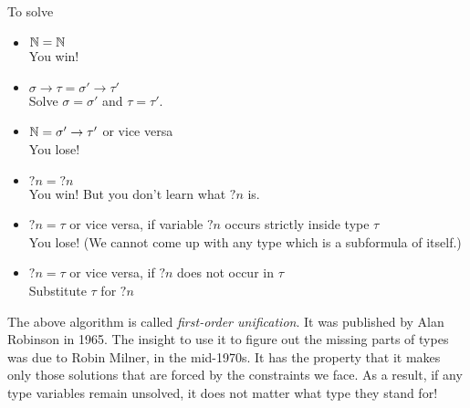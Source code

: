 \documentclass{article}
\begin{document}
To solve
\begin{itemize}
\item $\mathbb{N} = \mathbb{N}$ \\ You win!
\item $\sigma\to\tau = \sigma'\to\tau'$ \\
  Solve $\sigma = \sigma'$ and $\tau = \tau'$.
\item $\mathbb{N} = \sigma'\to\tau'$ or vice versa \\ You lose!
\item $?n = ?n$ \\ You win! But you don't learn what $?n$ is.
\item $?n = \tau$ or vice versa, if variable $?n$ occurs strictly inside type $\tau$ \\
  You lose! (We cannot come up with any type which is a subformula of itself.)
\item $?n = \tau$ or vice versa, if $?n$ does not occur in $\tau$ \\
  Substitute $\tau$ for $?n$
\end{itemize}

The above algorithm is called \emph{first-order unification}. It was published by Alan
Robinson in 1965. The insight to use it to figure out the missing parts of types was
due to Robin Milner, in the mid-1970s. It has the property that it makes only those
solutions that are forced by the constraints we face. As a result, if any type
variables remain unsolved, it does not matter what type they stand for!
\end{document}
